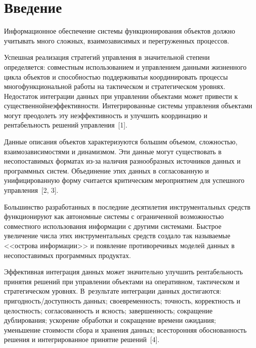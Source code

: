       \begin{multicols}{2}

            \label{st\stat}

    
\section{Введение}
      
      Информационное обеспечение системы функционирования объектов должно 
учитывать много сложных, взаимозависимых и перегруженных процессов. 

Успешная 
реализация стратегий управ\-ле\-ния в значительной степени определяется: совместным 
использованием и управлением данными жизненного цикла объектов и способностью 
поддерживать\linebreak и координировать процессы многофункциональной работы на тактическом 
и стратегическом уровнях. Недостаток интеграции данных при управ\-ле\-нии объектами 
может привести к существенной\linebreak неэффективности. Интегрированные сис\-те\-мы управ\-ле\-ния 
объектами могут преодолеть эту неэффективность и улучшить координацию и 
рентабельность решений управ\-ле\-ния~[1].
      
      Данные описания объектов характеризуются большим объемом, сложностью, 
взаимозависимостями и динамизмом. Эти данные могут существовать в несопоставимых 
форматах из-за наличия разнообразных источников данных и программных систем. 
Объединение этих данных в согласованную и унифицированную форму считается 
критическим мероприятием для успешного управления~[2, 3].
      
      Большинство разработанных в последние десятилетия инструментальных средств 
функционируют как автономные системы с ограниченной возмож\-ностью совместного 
использования информации с другими системами. Быстрое увеличение числа этих 
инструментальных средств создало так называемые <<острова информации>> и появление 
противоречивых моделей данных в несопоставимых программных продуктах.
      
      Эффективная интеграция данных может значительно улучшить рентабельность 
принятия решений при управлении объектами на оперативном, тактическом и 
стратегическом уровнях.\linebreak
 В~результате интеграции данных достигаются: 
пригодность/доступность данных; своевременность; точность, корректность и целостность; 
согласованность и ясность; завершенность; сокращение дуб\-ли\-ро\-ва\-ния; ускорение 
обработки и сокращение времени ожидания; уменьшение стоимости сбора и хранения 
данных; всесторонняя обоснованность решения и интегрированное принятие 
решений~[4].
      

\end{multicols}
